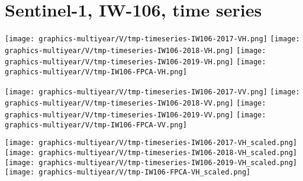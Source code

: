 
\section{Sentinel-1, IW-106, time series}
\setcounter{theorem}{0}

\renewcommand{\theenumi}{\roman{enumi}}
\renewcommand{\labelenumi}{\textnormal{(\theenumi)}$\;\;$}


\begin{center}
\begin{minipage}{7.0in}
\texttt{[image: graphics-multiyear/V/tmp-timeseries-IW106-2017-VH.png]}
\quad\quad
\texttt{[image: graphics-multiyear/V/tmp-timeseries-IW106-2018-VH.png]}
\vskip 1.0cm
\texttt{[image: graphics-multiyear/V/tmp-timeseries-IW106-2019-VH.png]}
\quad
\texttt{[image: graphics-multiyear/V/tmp-IW106-FPCA-VH.png]}
\end{minipage}
\end{center}


\begin{center}
\begin{minipage}{7.0in}
\texttt{[image: graphics-multiyear/V/tmp-timeseries-IW106-2017-VV.png]}
\quad\quad
\texttt{[image: graphics-multiyear/V/tmp-timeseries-IW106-2018-VV.png]}
\vskip 1.0cm
\texttt{[image: graphics-multiyear/V/tmp-timeseries-IW106-2019-VV.png]}
\quad
\texttt{[image: graphics-multiyear/V/tmp-IW106-FPCA-VV.png]}
\end{minipage}
\end{center}


\begin{center}
\begin{minipage}{7.0in}
\texttt{[image: graphics-multiyear/V/tmp-timeseries-IW106-2017-VH\_scaled.png]}
\quad\quad
\texttt{[image: graphics-multiyear/V/tmp-timeseries-IW106-2018-VH\_scaled.png]}
\vskip 1.0cm
\texttt{[image: graphics-multiyear/V/tmp-timeseries-IW106-2019-VH\_scaled.png]}
\quad
\texttt{[image: graphics-multiyear/V/tmp-IW106-FPCA-VH\_scaled.png]}
\end{minipage}
\end{center}

